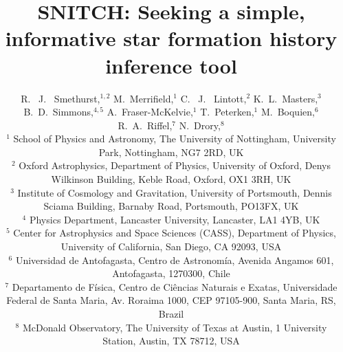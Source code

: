 \documentclass[useAMS,usenatbib]{mn2e}
\begin{document}
\title[\textsc{snitch}: inferring informative  SFHs]{SNITCH: Seeking a simple, informative star formation history inference tool}
\author[Smethurst et al. 2018]{R. ~J. ~Smethurst,$^{1,2}$ M.~Merrifield,$^{1}$ C. ~J. ~Lintott,$^{2}$ K.~L.~Masters,$^{3}$ B.~D.~Simmons,$^{4,5}$ \newauthor A.~Fraser-McKelvie,$^{1}$ T.~Peterken,$^{1}$ M.~Boquien,$^{6}$ R.~A.~Riffel,$^{7}$ N.~Drory,$^{8}$
\\ $^1$ School of Physics and Astronomy, The University of Nottingham, University Park, Nottingham, NG7 2RD, UK
\\ $^2$ Oxford Astrophysics, Department of Physics, University of Oxford, Denys Wilkinson Building, Keble Road, Oxford, OX1 3RH, UK
\\ $^3$ Institute of Cosmology and Gravitation, 
University of Portsmouth, Dennis Sciama Building, Barnaby Road, Portsmouth, PO13FX, UK
\\ $^4$ Physics Department, Lancaster University, Lancaster, LA1 4YB, UK
\\ $^5$ Center for Astrophysics and Space Sciences (CASS), Department of Physics, University of California, San Diego, CA 92093, USA
\\ $^6$ Universidad de Antofagasta, Centro de Astronom\'ia, Avenida Angamos 601, Antofagasta, 1270300, Chile
\\ $^7$ Departamento de Física, Centro de Ciências Naturais e Exatas,  Universidade Federal de Santa Maria, Av. Roraima 1000, CEP 97105-900, Santa Maria, RS, Brazil 
\\ $^8$ McDonald Observatory, The University of Texas at Austin, 1 University Station, Austin, TX 78712, USA
}

\maketitle
\end{document}

